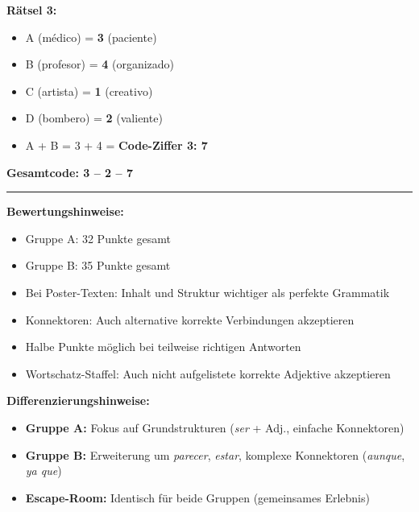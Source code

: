 \documentclass[11pt,a4paper]{article}
\newcommand{\lsg}[1]{\textcolor{loesung}{\textbf{#1}}}
\newcommand{\es}[1]{\textit{#1}}
\begin{document}
\begin{gruppeBbox}
\textbf{Rätsel 3:}
\begin{itemize}[leftmargin=1.5em, nosep]
    \item A (médico) = \lsg{3} (paciente)
    \item B (profesor) = \lsg{4} (organizado)
    \item C (artista) = \lsg{1} (creativo)
    \item D (bombero) = \lsg{2} (valiente)
    \item A + B = 3 + 4 = \textbf{Code-Ziffer 3: \lsg{7}}
\end{itemize}

\textbf{Gesamtcode: \lsg{3 -- 2 -- 7}}

\end{gruppeBbox}

\vspace{1em}
\hrule
\vspace{0.3em}

\textbf{Bewertungshinweise:}
\begin{itemize}[leftmargin=1.5em, nosep]
    \item Gruppe A: 32 Punkte gesamt
    \item Gruppe B: 35 Punkte gesamt
    \item Bei Poster-Texten: Inhalt und Struktur wichtiger als perfekte Grammatik
    \item Konnektoren: Auch alternative korrekte Verbindungen akzeptieren
    \item Halbe Punkte möglich bei teilweise richtigen Antworten
    \item Wortschatz-Staffel: Auch nicht aufgelistete korrekte Adjektive akzeptieren
\end{itemize}

\vspace{0.5em}
\textbf{Differenzierungshinweise:}
\begin{itemize}[leftmargin=1.5em, nosep]
    \item \textbf{Gruppe A:} Fokus auf Grundstrukturen (\es{ser} + Adj., einfache Konnektoren)
    \item \textbf{Gruppe B:} Erweiterung um \es{parecer}, \es{estar}, komplexe Konnektoren (\es{aunque}, \es{ya que})
    \item \textbf{Escape-Room:} Identisch für beide Gruppen (gemeinsames Erlebnis)
\end{itemize}
\end{document}
